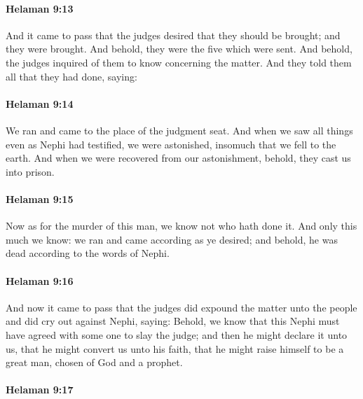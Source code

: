		\paragraph{Helaman 9:13} %
			\label{HELAMAN-9-13}

			And it came to pass that
			the judges desired that they should be brought;
			and they were brought.
			And behold, they were the five which were sent.
			And behold, the judges inquired of them to know concerning the matter.
			And they told them all that they had done, saying:

		\paragraph{Helaman 9:14} %
			\label{HELAMAN-9-14}

			We ran and came to the place of the judgment seat.
			And when we saw all things even as Nephi had testified,
			we were astonished, insomuch that we fell to the earth.
			And when we were recovered from our astonishment,
			behold, they cast us into prison.

		\paragraph{Helaman 9:15} %
			\label{HELAMAN-9-15}

			Now as for the murder of this man,
			we know not who hath done it.
			And only this much we know:
			we ran and came according as ye desired;
			and behold, he was dead according to the words of Nephi.

		\paragraph{Helaman 9:16} %
			\label{HELAMAN-9-16}

			And now it came to pass that
			the judges did expound the matter unto the people
			and did cry out against Nephi, saying:
			Behold, we know that this Nephi must have agreed
			with some one to slay the judge;
			and then he might declare it unto us,
			that he might convert us unto his faith,
			that he might raise himself to be a great man,
			chosen of God and a prophet.

		\paragraph{Helaman 9:17} %
			\label{HELAMAN-9-17}

